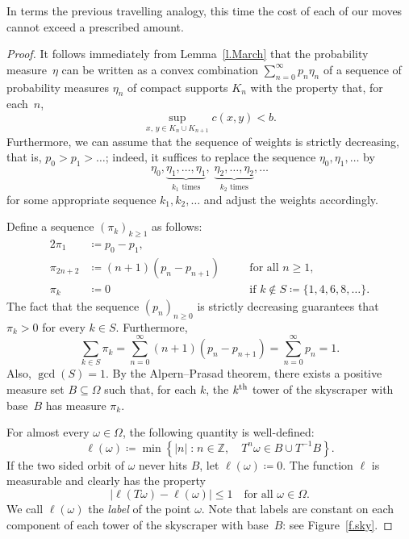 \documentclass[AHL,Unicode,longabstracts,published]{cedram}
\DeclareMathOperator{\gcdd}{gcd}
\newcommand{\Z}{\mathbb{Z}}
\newcommand{\st}{\;\mathord{:}\;}
\begin{document}
In terms the previous travelling analogy, this time the cost of each of our moves cannot exceed a prescribed amount.

\begin{proof}
It follows immediately from Lemma~\ref{l.March} that the probability measure~$\eta$ can be written as a convex combination $\sum_{n=0}^\infty p_n \eta_n$ of a sequence of probability measures $\eta_n$ of compact supports $K_n$ with the property that, for each~$n$,
\begin{equation}\label{e.lunchtime}
\sup_{x, \, y \in K_n \cup K_{n+1}} c(x,y) < b.
\end{equation}
Furthermore, we can assume that the sequence of weights is strictly decreasing, that is, $p_0>p_1>\dots$; indeed, it suffices to replace the sequence $\eta_0,\eta_1,\dots$ by
\begin{equation}
\eta_0,
\underbrace{\eta_1,\dots,\eta_1}_{\text{$k_1$ times}},\; 
\underbrace{\eta_2,\dots,\eta_2}_{\text{$k_2$ times}}, \dots
\end{equation}
for some appropriate sequence $k_1,k_2,\dots$ and adjust the weights accordingly.

Define a sequence $(\pi_k)_{k \ge 1}$ as follows:
\begin{alignat}{2}
\pi_1 &\coloneqq p_0 - p_1, \\
\pi_{2n+2}&\coloneqq (n+1)(p_n-p_{n+1}) &\quad&\text{for all $n \ge 1$,} \\
\pi_k&\coloneqq 0  &\quad&\text{if $k \not\in S \coloneqq \{1,4,6,8,\dots\}$}.
\end{alignat}
The fact that the sequence $(p_n)_{n \ge 0}$ is strictly decreasing guarantees that $\pi_k > 0$ for every $k \in S$. Furthermore,
\begin{equation}
\sum_{k \in S} \pi_k = \sum_{n=0}^\infty (n+1)(p_n-p_{n+1}) = \sum_{n=0}^\infty p_n = 1.
\end{equation}
Also, $\gcdd(S) = 1$. By the Alpern--Prasad theorem, there exists a positive measure set $B \subseteq \Omega$ such that, for each $k$, the $k^{\rm th}$ tower of the skyscraper with base~$B$ has measure $\pi_k$.

For almost every $\omega \in \Omega$, the following quantity is well-defined:
\begin{equation}
\ell(\omega) \coloneqq \min \left\{|n| \st n\in \Z, \quad T^n \omega \in B \cup T^{-1} B \right\}.
\end{equation}
If the two sided orbit of $\omega$ never hits $B$, let $\ell(\omega) \coloneqq 0$. The function $\ell$ is measurable and clearly has the property
\begin{equation}\label{e.at_most_one}
|\ell(T\omega) - \ell(\omega)| \le 1 \quad \text{for all $\omega \in \Omega$.}
\end{equation}
We call $\ell(\omega)$ the \emph{label} of the point $\omega$. Note that labels are constant on each component of each tower of the skyscraper with base~$B$: see Figure~\ref{f.sky}.


\end{proof}
\end{document}
